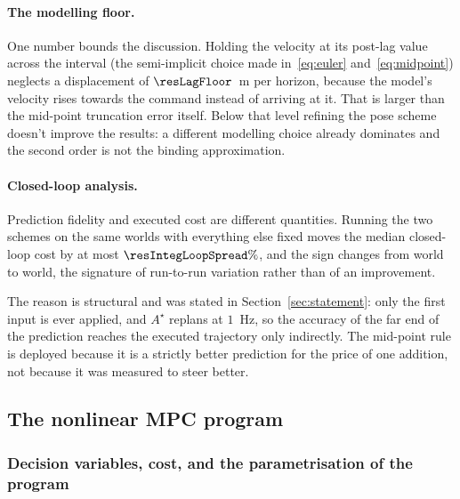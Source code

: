 \documentclass[11pt,a4paper]{article}
\newcommand{\astar}{$A^\star$}
\begin{document}
\paragraph{The modelling floor.} One number bounds the discussion. Holding the velocity at its post-lag value
across the interval (the semi-implicit choice made in~\eqref{eq:euler} and~\eqref{eq:midpoint}) neglects
a displacement of $\resLagFloor$~m per horizon, because the model's velocity rises towards the command
instead of arriving at it. That is larger than the mid-point truncation error itself. Below that level
refining the pose scheme doesn't improve the results: a different modelling choice already dominates and the second
order is not the binding approximation.

\paragraph{Closed-loop analysis.} Prediction fidelity and executed cost are different quantities.
Running the two schemes on the same worlds with everything else fixed moves the median closed-loop cost by at
most $\resIntegLoopSpread\%$, and the sign changes from world to world, the signature of run-to-run
variation rather than of an improvement.

\begin{table}[htbp]
  \centering
  \small
  \caption{%
  Closed-loop cost with the two integrators, same profile otherwise. A positive $\Delta$ means the
  mid-point rule is cheaper.}
  \label{res:tab:integloop}
\end{table}

The reason is structural and was stated in Section~\ref{sec:statement}: only the first input is ever applied,
and \astar{} replans at $1$~Hz, so the accuracy of the far end of the prediction reaches the executed
trajectory only indirectly. The mid-point rule is deployed because it is a strictly better prediction for the
price of one addition, not because it was measured to steer better.

\subsection{The nonlinear MPC program}
\label{sec:nlp}

\subsubsection{Decision variables, cost, and the parametrisation of the program}
\label{sec:shoot}
\end{document}

